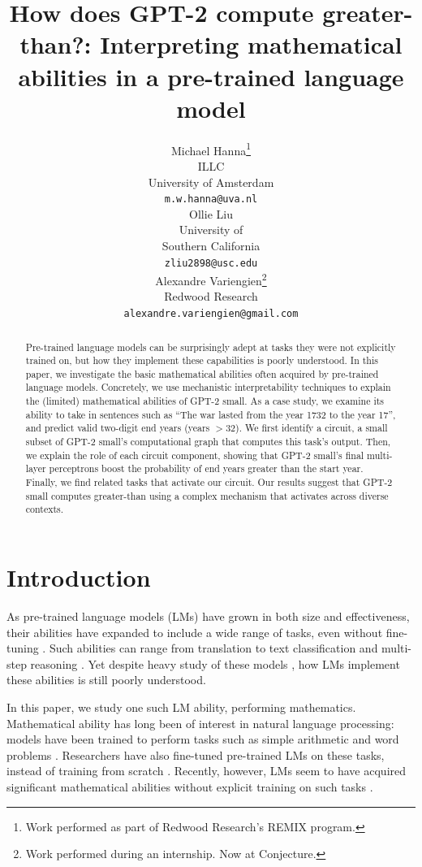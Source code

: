 \documentclass{article}
\title{How does GPT-2 compute greater-than?: Interpreting mathematical abilities in a pre-trained language model}
\author{Michael Hanna\thanks{Work performed as part of Redwood Research's REMIX program.}\\
	ILLC\\
	University of Amsterdam\\
	\texttt{m.w.hanna@uva.nl} \\
      \And
	Ollie Liu\footnotemark[1]\\
	University of\\
        Southern California\\
	\texttt{zliu2898@usc.edu} \\
      \And
	Alexandre Variengien\thanks{Work performed during an internship. Now at Conjecture.}\\
	Redwood Research \\
        \texttt{alexandre.variengien@gmail.com} \\
}
\begin{document}
	
	\maketitle
	\begin{abstract}  
        Pre-trained language models can be surprisingly adept at tasks they were not explicitly trained on, but how they implement these capabilities is poorly understood. In this paper, we investigate the basic mathematical abilities often acquired by pre-trained language models. Concretely, we use mechanistic interpretability techniques to explain the (limited) mathematical abilities of GPT-2 small. As a case study, we examine its ability to take in sentences such as ``The war lasted from the year 1732 to the year 17'', and predict valid two-digit end years (years $> 32$). We first identify a circuit, a small subset of GPT-2 small's computational graph that computes this task's output. Then, we explain the role of each circuit component, showing that GPT-2 small's final multi-layer perceptrons boost the probability of end years greater than the start year. Finally, we find related tasks that activate our circuit. Our results suggest that GPT-2 small computes greater-than using a complex mechanism that activates across diverse contexts.
	
	\end{abstract}

    \setcounter{footnote}{0}     
    \section{Introduction}
    As pre-trained language models (LMs) have grown in both size and effectiveness, their abilities have expanded to include a wide range of tasks, even without fine-tuning \citep{brown2020gpt3}. Such abilities can range from translation to text classification and multi-step reasoning \citep{wei2022emergent}. Yet despite heavy study of these models \citep{rogers-etal-2020-primer,rauker2022transparent, li2023emergent}, how LMs implement these abilities is still poorly understood. 

    In this paper, we study one such LM ability, performing mathematics. Mathematical ability has long been of interest in natural language processing: models have been trained to perform tasks such as simple arithmetic and word problems \citep{wang-etal-2017-deep,thawani-etal-2021-representing}. Researchers have also fine-tuned pre-trained LMs on these tasks, instead of training from scratch \citep{geva-etal-2020-injecting,lewkowycz2022solving}. Recently, however, LMs seem to have acquired significant mathematical abilities without explicit training on such tasks \citep{brown2020gpt3,nye2021work,chowdhery2022palm,frieder2023mathematical}.
\end{document}
